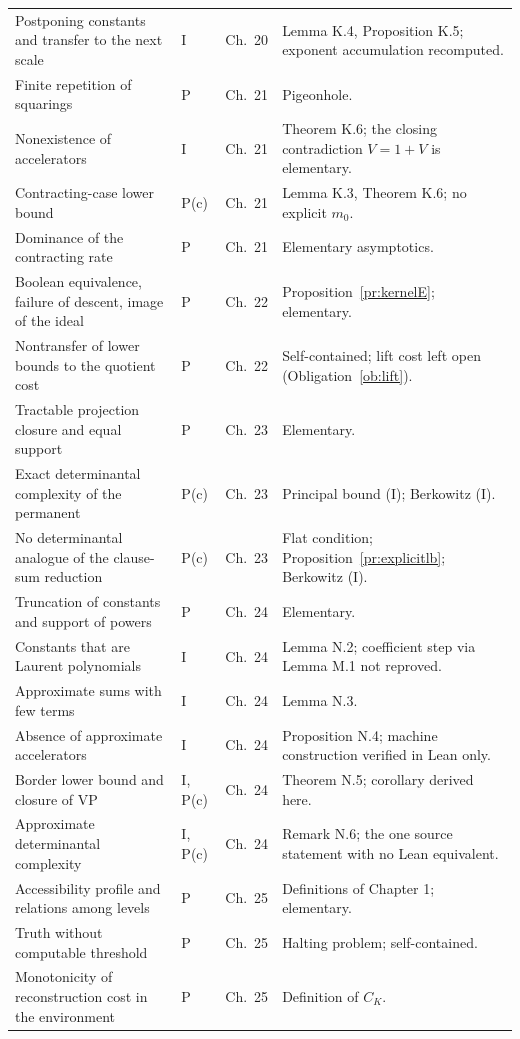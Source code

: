 \documentclass[11pt,letterpaper]{report}
\theoremstyle{plain}
\theoremstyle{definition}
\theoremstyle{remark}
\begin{document}
{\begin{longtable}{p{}p{}p{}p{}}
Postponing constants and transfer to the next scale & I & Ch.\ 20 & Lemma K.4, Proposition K.5; exponent accumulation recomputed.\\
Finite repetition of squarings & P & Ch.\ 21 & Pigeonhole.\\
Nonexistence of accelerators & I & Ch.\ 21 & Theorem K.6; the closing contradiction $V=1+V$ is elementary.\\
Contracting-case lower bound & P(c) & Ch.\ 21 & Lemma K.3, Theorem K.6; no explicit $m_0$.\\
Dominance of the contracting rate & P & Ch.\ 21 & Elementary asymptotics.\\
Boolean equivalence, failure of descent, image of the ideal & P & Ch.\ 22 & Proposition~\ref{pr:kernelE}; elementary.\\
Nontransfer of lower bounds to the quotient cost & P & Ch.\ 22 & Self-contained; lift cost left open (Obligation~\ref{ob:lift}).\\
Tractable projection closure and equal support & P & Ch.\ 23 & Elementary.\\
Exact determinantal complexity of the permanent & P(c) & Ch.\ 23 & Principal bound (I); Berkowitz (I).\\
No determinantal analogue of the clause-sum reduction & P(c) & Ch.\ 23 & Flat condition; Proposition~\ref{pr:explicitlb}; Berkowitz (I).\\
Truncation of constants and support of powers & P & Ch.\ 24 & Elementary.\\
Constants that are Laurent polynomials & I & Ch.\ 24 & Lemma N.2; coefficient step via Lemma M.1 not reproved.\\
Approximate sums with few terms & I & Ch.\ 24 & Lemma N.3.\\
Absence of approximate accelerators & I & Ch.\ 24 & Proposition N.4; machine construction verified in Lean only.\\
Border lower bound and closure of VP & I, P(c) & Ch.\ 24 & Theorem N.5; corollary derived here.\\
Approximate determinantal complexity & I, P(c) & Ch.\ 24 & Remark N.6; the one source statement with no Lean equivalent.\\
Accessibility profile and relations among levels & P & Ch.\ 25 & Definitions of Chapter 1; elementary.\\
Truth without computable threshold & P & Ch.\ 25 & Halting problem; self-contained.\\
Monotonicity of reconstruction cost in the environment & P & Ch.\ 25 & Definition of $C_K$.\\

\end{longtable}}
\end{document}
